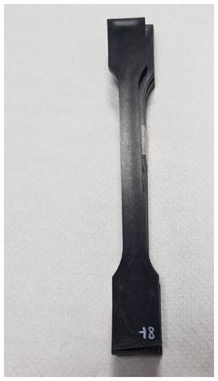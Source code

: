 \documentclass[a4paper, 11pt]{article}
\begin{document}
\begin{figure}[htp]
{\includegraphics[scale=0.25]{PPB}} \qquad
\subfloat[][]

\end{figure}
\end{document}
